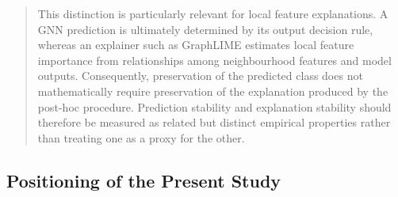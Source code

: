 \documentclass[a4paper]{article}
\begin{document}
\begin{quote}
This distinction is particularly relevant for local feature
explanations. A GNN prediction is ultimately determined by its output
decision rule, whereas an explainer such as GraphLIME estimates local
feature importance from relationships among neighbourhood features and
model outputs. Consequently, preservation of the predicted class does
not mathematically require preservation of the explanation produced by
the post-hoc procedure. Prediction stability and explanation stability
should therefore be measured as related but distinct empirical
properties rather than treating one as a proxy for the other.
\end{quote}

\subsection{\texorpdfstring{Positioning of the Present Study
}{Positioning of the Present Study }}\label{positioning-of-the-present-study}
\end{document}
